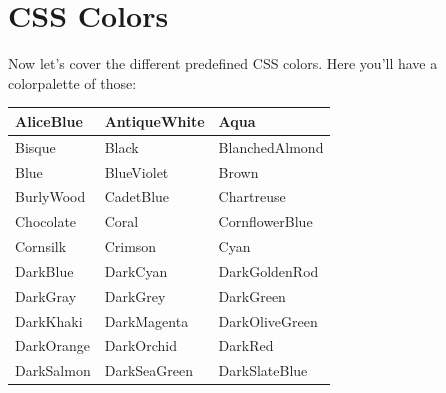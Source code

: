 \documentclass[a4paper,12pt]{article}
\begin{document}
\section{CSS Colors}
Now let's cover the different predefined CSS colors. Here you'll have a colorpalette of those:\\
\begin{center}
\setlength{\arrayrulewidth}{1mm}
\setlength{\tabcolsep}{18pt}
\begin{longtable}{|p{}|p{}|p{}|}
    \hline
    \cellcolor[HTML]{F0F8FF} AliceBlue         & \cellcolor[HTML]{FAEBD7} AntiqueWhite         & \cellcolor[HTML]{00FFFF} Aqua            \\ \hline
    \cellcolor[HTML]{FFE4C4} Bisque            & \cellcolor[HTML]{000000} Black                & \cellcolor[HTML]{FFEBCD} BlanchedAlmond  \\ \hline
    \cellcolor[HTML]{0000FF} Blue              & \cellcolor[HTML]{8A2BE2} BlueViolet           & \cellcolor[HTML]{A52A2A} Brown           \\ \hline
    \cellcolor[HTML]{DEB887} BurlyWood         & \cellcolor[HTML]{5F9EA0} CadetBlue            & \cellcolor[HTML]{7FFF00} Chartreuse      \\ \hline
    \cellcolor[HTML]{D2691E} Chocolate         & \cellcolor[HTML]{FF7F50} Coral                & \cellcolor[HTML]{6495ED} CornflowerBlue  \\ \hline
    \cellcolor[HTML]{FFF8DC} Cornsilk          & \cellcolor[HTML]{DC143C} Crimson              & \cellcolor[HTML]{00FFFF} Cyan            \\ \hline
    \cellcolor[HTML]{00008B} DarkBlue          & \cellcolor[HTML]{008B8B} DarkCyan             & \cellcolor[HTML]{B8860B} DarkGoldenRod   \\ \hline
    \cellcolor[HTML]{A9A9A9} DarkGray          & \cellcolor[HTML]{A9A9A9} DarkGrey             & \cellcolor[HTML]{006400} DarkGreen       \\ \hline
    \cellcolor[HTML]{BDB76B} DarkKhaki         & \cellcolor[HTML]{8B008B} DarkMagenta          & \cellcolor[HTML]{556B2F} DarkOliveGreen  \\ \hline
    \cellcolor[HTML]{FF8C00} DarkOrange        & \cellcolor[HTML]{9932CC} DarkOrchid           & \cellcolor[HTML]{8B0000} DarkRed         \\ \hline
    \cellcolor[HTML]{E9967A} DarkSalmon        & \cellcolor[HTML]{8FBC8F} DarkSeaGreen         & \cellcolor[HTML]{483D8B} DarkSlateBlue   \\ \hline

\end{longtable}
\end{center}
\end{document}
